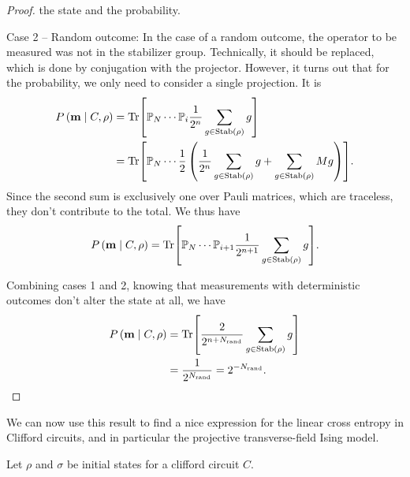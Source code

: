 \begin{proof}
the state and the probability.
\par{Case 2 -- Random outcome:}
In the case of a random outcome, the operator to be measured was not in the
stabilizer group. Technically, it should be replaced, which is done by
conjugation with the projector. However, it turns out that for the probability,
we only need to consider a single projection. It is
\begin{align}
  P\left(\mathbf{m} \mid C, \rho\right) 
  &= \Tr[ \mathbb{P}_N \cdots \mathbb{P}_i \frac{1}{2^n}\sum_{g \in
  \mathrm{Stab}(\rho)} g]\nonumber\\
  &= \Tr[ \mathbb{P}_N \cdots \frac{1}{2} \left(\frac{1}{2^n} \sum_{g \in
  \mathrm{Stab}(\rho)} g + \sum_{g \in \mathrm{Stab}(\rho)} Mg\right) ]
.\end{align}
Since the second sum is exclusively one over Pauli matrices, which are traceless,
they don't contribute to the total. We thus have
\begin{align}
  P\left(\mathbf{m} \mid C, \rho\right) 
  = \Tr[\mathbb{P}_N \cdots \mathbb{P}_{i+1} \frac{1}{2^{n+1}}
  \sum_{g\in\mathrm{Stab}(\rho)} g]
.\end{align}

Combining cases 1 and 2, knowing that measurements with deterministic outcomes
don't alter the state at all, we have
\begin{align}
  P\left(\mathbf{m} \mid C, \rho\right) 
  &= \Tr[\frac{2}{2^{n+N_\mathrm{rand}}} \sum_{g\in\mathrm{Stab}(\rho)}
  g]\nonumber\\
  &= \frac{1}{2^{N_\mathrm{rand}}} = 2^{-N_\mathrm{rand}}
.\end{align}
%
\end{proof}
We can now use this result to find a nice expression for the linear cross
entropy in Clifford circuits, and in particular the projective transverse-field
Ising model.
\begin{thm}\label{thm:lxe-cliff}
  Let $\rho$ and $\sigma$ be initial states for a clifford circuit $C$. 
  
\end{thm}


